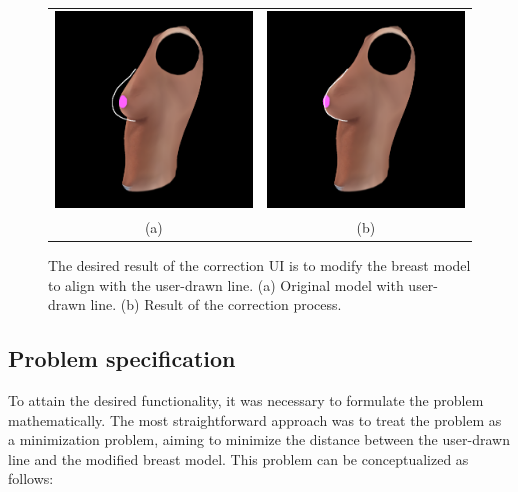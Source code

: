 \begin{figure}[H]
    \centering
    \begin{tabular}{@{}cc@{}}
        \includegraphics[width=0.487\linewidth]{figures/correction_ui_pre.png}&
        \includegraphics[width=0.487\linewidth]{figures/correction_ui_post.png}\\
        (a)&(b)\\
        \end{tabular}
    \caption[Correction UI results]{The desired result of the correction UI is to modify the breast model to align with the user-drawn line.
    \textup{(a)} Original model with user-drawn line.
    \textup{(b)} Result of the correction process.
    }
    \label{fig:ui_correction}
\end{figure}

\subsection{Problem specification}

To attain the desired functionality, it was necessary to formulate the problem mathematically. The most straightforward approach was to treat the problem as a minimization problem, 
aiming to minimize the distance between the user-drawn line and the modified breast model. This problem can be conceptualized as follows:


